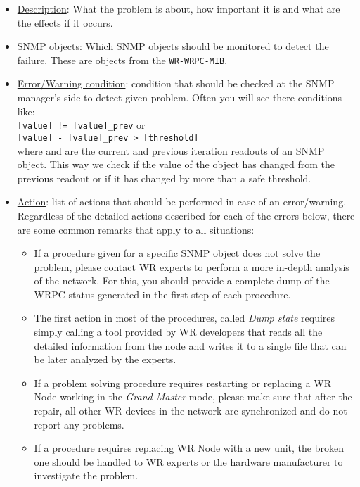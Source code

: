 \begin{itemize}[leftmargin=0pt]
	\item [] \underline{Description}: What the problem is about, how important it
		is and what are the effects if it occurs.
	\item [] \underline{SNMP objects}: Which SNMP objects should be monitored to
		detect the failure. These are objects from the \texttt{WR-WRPC-MIB}.
	\item [] \underline{Error/Warning condition}: condition that should be checked
		at the SNMP manager's side to detect given problem. Often you will see there
    conditions like:\\
    \texttt{[value] != [value]\_prev} or\\
    \texttt{[value] - [value]\_prev > [threshold]}\\
    where \text{[value]} and  are the current and previous
    iteration readouts of an SNMP object. This way we check if the value of the
    object has changed from the previous readout or if it has changed by more
    than a safe threshold.
  \item [] \underline{Action}: list of actions that should be performed in case
    of an error/warning. Regardless of the detailed actions described for each
    of the errors below, there are some common remarks that apply to all
    situations:
    \begin{itemize}
    \item If a procedure given for a specific SNMP object does not solve the
      problem, please contact WR experts to perform a more in-depth analysis of
      the network. For this, you should provide a complete dump of the WRPC
      status generated in the first step of each procedure.
    \item The first action in most of the procedures, called \emph{Dump state}
      requires simply calling a tool provided by WR developers that reads all
      the detailed information from the node and writes it to a single file
      that can be later analyzed by the experts.
    \item If a problem solving procedure requires restarting or replacing a WR
      Node working in the \emph{Grand Master} mode, please make sure that after
      the repair, all other WR devices in the network are synchronized and do
      not report any problems.
    \item If a procedure requires replacing WR Node with a new unit, the
      broken one should be handled to WR experts or the hardware manufacturer to
      investigate the problem.
    \end{itemize}
\end{itemize}

